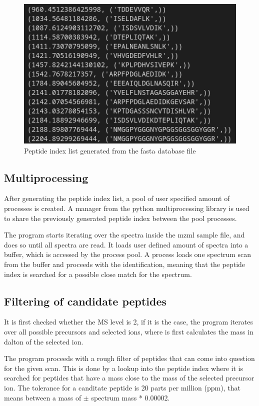 \documentclass[11pt]{article}
\begin{document}
\begin{figure}
\includegraphics[width=\linewidth]{figs/peptindex.png} 
\caption{Peptide index list generated from the fasta database file}
\label{fig:peptindex}
\end{figure}

\subsection{Multiprocessing}
After generating the peptide index list, a pool of user specified amount of processes is created. A manager from the python multiprocessing library is used to share the previously generated peptide index between the pool processes. 

The program starts iterating over the spectra inside the mzml sample file, and does so until all spectra are read. It loads user defined amount of spectra into a buffer, which is accessed by the process pool. A process loads one spectrum scan from the buffer and proceeds with the identification, meaning that the peptide index is searched for a possible close match for the spectrum.

\subsection{Filtering of candidate peptides}
It is first checked whether the MS level is 2, if it is the case, the program iterates over all possible precursors and selected ions, where is first calculates the mass in dalton of the selected ion.

The program proceeds with a rough filter of peptides that can come into question for the given scan. This is done by a lookup into the peptide index where it is searched for peptides that have a mass close to the mass of the selected precursor ion. The tolerance for a canditate peptide is 20 parts per million (ppm), that means between a mass of $\pm$ spectrum mass * 0.00002.
\end{document}
